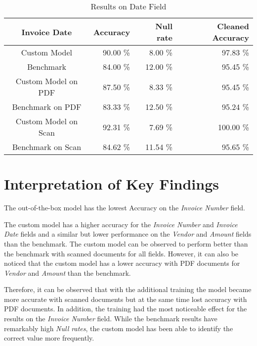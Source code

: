 \begin{table}[ht]   %
    \centering
    \footnotesize
    \begin{tabular}{c|rrr} %
        \toprule    %
        Invoice Date  & Accuracy  & Null rate & Cleaned Accuracy \\
        \midrule    %
        Custom Model               & 90.00 \%   & 8.00 \%   & 97.83 \% \\
        Benchmark           & 84.00 \%   & 12.00 \%  & 95.45 \%\\
        \midrule    %
        Custom Model on PDF        & 87.50 \%   & 8.33 \%  & 95.45 \% \\
        Benchmark on PDF    & 83.33 \%   & 12.50 \%  & 95.24 \% \\
        \midrule    %
        Custom Model on Scan       & 92.31 \%  & 7.69 \%   & 100.00 \% \\
        Benchmark on Scan   & 84.62 \%  & 11.54 \%  & 95.65 \% \\

        \bottomrule %
    \end{tabular}
    \caption{Results on Date Field}
    \label{table:Model_Bench_Date}
\end{table}

\newpage
\section{Interpretation of Key Findings}
The out-of-the-box model has the lowest Accuracy on the \textit{Invoice Number} field.


The custom model has a higher accuracy for the \textit{Invoice Number} and \textit{Invoice Date} fields and a similar but lower performance on the \textit{Vendor} and \textit{Amount} fields than the benchmark.
The custom model can be observed to perform better than the benchmark with scanned documents for all fields. However, it can also be noticed that the custom model has a lower accuracy with PDF documents for \textit{Vendor} and \textit{Amount} than the benchmark.

Therefore, it can be observed that with the additional training the model became more accurate with scanned documents but at the same time lost accuracy with PDF documents. In addition, the training had the most noticeable effect for the results on the \textit{Invoice Number} field. While the benchmark results have remarkably high \textit{Null rates}, the custom model has been able to identify the correct value more frequently.